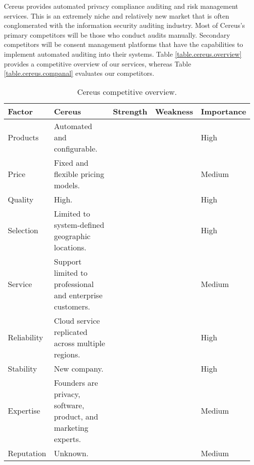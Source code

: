 Cereus provides automated privacy compliance auditing and risk management services. This is an extremely niche and relatively new market that is often conglomerated with the information security auditing industry. Most of Cereus's primary competitors will be those who conduct audits manually. Secondary competitors will be consent management platforms that have the capabilities to implement automated auditing into their systems. Table \ref{table.cereus.overview} provides a competitive overview of our services, whereas Table \ref{table.cereus.companal} evaluates our competitors.

\begin{table}[H]
  \caption{Cereus competitive overview.}
  \centering
  \setlength\tabcolsep{5pt}
  \def\arraystretch{1.2}%

  \begin{tabularx}{\textwidth}{p{2cm}|p{6.2cm} p{1.5cm} p{1.75cm} p{1.85cm} }

    \hline

    Factor & Cereus & Strength & Weakness & Importance  \\
  
    \hline
  
    Products & Automated and configurable. & \centering{x} & & High \\

    Price & Fixed and flexible pricing models. & \centering{x} & & Medium \\

    Quality & High. & \centering{x} & & High \\

    Selection & Limited to system-defined geographic locations. & & \centering{x} & High \\

    Service & Support limited to professional and enterprise customers. & & \centering{x} & Medium \\

    Reliability & Cloud service replicated across multiple regions. & \centering{x} & & High \\

    Stability & New company. & & \centering{x} & High \\

    Expertise & Founders are privacy, software, product, and marketing experts. & \centering{x} & & Medium \\

    Reputation & Unknown. & & \centering{x} & Medium \\


\end{tabularx}
\end{table}
